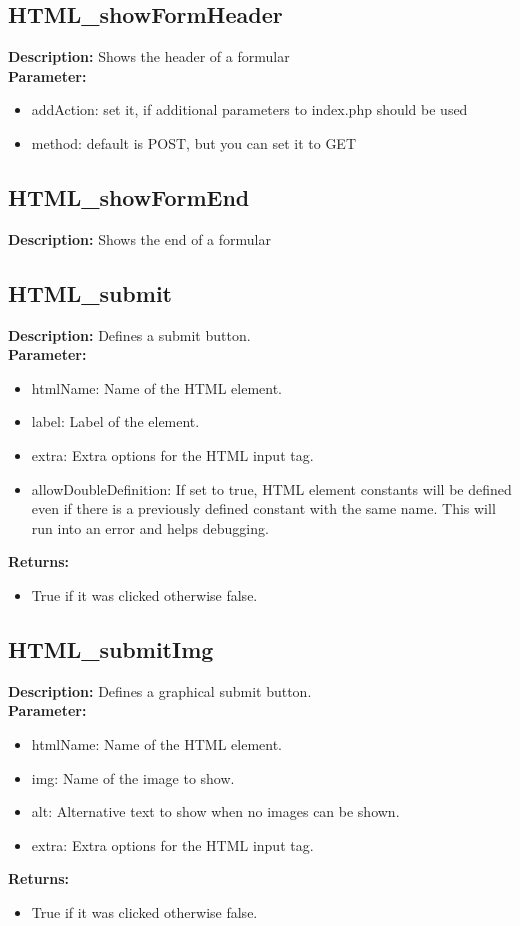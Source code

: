 \subsection{HTML\_showFormHeader}
\textbf{Description:} Shows the header of a formular\\
\textbf{Parameter:}
\begin{itemize}
\item addAction: set it, if additional parameters to index.php should be used
\item method: default is POST, but you can set it to GET
\end{itemize}

\subsection{HTML\_showFormEnd}
\textbf{Description:} Shows the end of a formular\\

\subsection{HTML\_submit}
\textbf{Description:} Defines a submit button.\\
\textbf{Parameter:}
\begin{itemize}
\item htmlName: Name of the HTML element.
\item label: Label of the element.
\item extra: Extra options for the HTML input tag.
\item allowDoubleDefinition: If set to true, HTML element constants will be defined even if there is a previously defined constant with the same name. This will run into an error and helps debugging.
\end{itemize}
\textbf{Returns:}
\begin{itemize}
\item True if it was clicked otherwise false.
\end{itemize}

\subsection{HTML\_submitImg}
\textbf{Description:} Defines a graphical submit button.\\
\textbf{Parameter:}
\begin{itemize}
\item htmlName: Name of the HTML element.
\item img: Name of the image to show.
\item alt: Alternative text to show when no images can be shown.
\item extra: Extra options for the HTML input tag.
\end{itemize}
\textbf{Returns:}
\begin{itemize}
\item True if it was clicked otherwise false.
\end{itemize}

